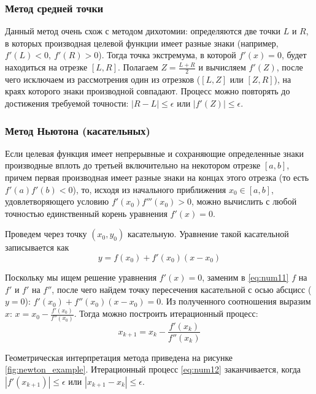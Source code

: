 \documentclass[a4paper,12pt]{report}
\begin{document}
\subsubsection{Метод средней точки}
Данный метод очень схож с методом дихотомии: определяются две точки $L$ и $R$, в которых производная целевой функции имеет разные знаки (например, $f'(L) < 0,\ f'(R) > 0$). Тогда точка экстремума, в которой $f'(x) = 0$, будет находиться на отрезке $[L, R]$. Полагаем $Z = \frac{L+R}{2}$ и вычисляем $f'(Z)$, после чего исключаем из рассмотрения один из отрезков ($[L, Z]$ или $[Z, R]$), на краях которого знаки производной совпадают. Процесс можно повторять до достижения требуемой точности: $\left|R-L\right| \leq \epsilon$ или $\left|f'(Z)\right| \leq \epsilon$.

\subsubsection{Метод Ньютона (касательных)}
Если целевая функция имеет непрерывные и сохраняющие определенные знаки производные вплоть до третьей включительно на некотором отрезке $[a, b]$, причем первая производная имеет разные знаки на концах этого отрезка (то есть $f'(a)f'(b) < 0$), то, исходя из начального приближения $x_{0} \in [a, b]$, удовлетворяющего условию $f'(x_{0})f'''(x_{0}) > 0$, можно вычислить с любой точностью единственный корень уравнения $f'(x) = 0$.

Проведем через точку $(x_{0}, y_{0})$ касательную. Уравнение такой касательной записывается как
\begin{equation}
\label{eq:num11}
y = f(x_{0}) + f'(x_{0})(x-x_{0})
\end{equation}

Поскольку мы ищем решение уравнения $f'(x) = 0$, заменим в \eqref{eq:num11} $f$ на $f'$ и $f'$ на $f''$, после чего найдем точку пересечения касательной с осью абсцисс ($y = 0$): $f'(x_{0}) + f''(x_{0})(x-x_{0}) = 0$. Из полученного соотношения выразим $x$: $x = x_{0} - \frac{f'(x_{0})}{f''(x_{0})}$. Тогда можно построить итерационный процесс:
\begin{equation}
\label{eq:num12}
x_{k+1} = x_{k} - \frac{f'(x_{k})}{f''(x_{k})}
\end{equation}

Геометрическая интерпретация метода приведена на рисунке \ref{fig:newton_example}. Итерационный процесс \eqref{eq:num12} заканчивается, когда $\left|f'(x_{k+1})\right| \leq \epsilon$ или $\left|x_{k+1}-x_{k}\right| \leq \epsilon$.
\end{document}

